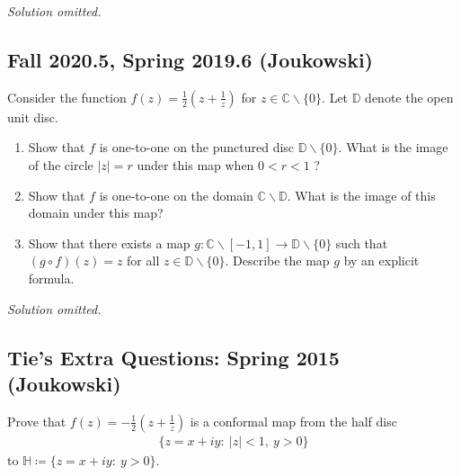 \emph{Solution omitted.}

\hypertarget{fall-2020.5-spring-2019.6-joukowski}{%
\subsection{Fall 2020.5, Spring 2019.6
(Joukowski)}\label{fall-2020.5-spring-2019.6-joukowski}}

\begin{problem}[?]

Consider the function \(f(z)=\frac{1}{2}\left(z+\frac{1}{z}\right)\) for
\(z \in \mathbb{C} \backslash\{0\}\). Let \(\mathbb{D}\) denote the open
unit disc.

\begin{enumerate}
\def\labelenumi{\alph{enumi}.}
\item
  Show that \(f\) is one-to-one on the punctured disc
  \(\mathbb{D} \backslash\{0\}\). What is the image of the circle
  \(|z|=r\) under this map when \(0<r<1\) ?
\item
  Show that \(f\) is one-to-one on the domain
  \(\mathbb{C} \backslash \mathbb{D}\). What is the image of this domain
  under this map?
\item
  Show that there exists a map
  \(g: \mathbb{C} \backslash[-1,1] \rightarrow \mathbb{D} \backslash\{0\}\)
  such that \((g \circ f)(z)=z\) for all
  \(z \in \mathbb{D} \backslash\{0\}\). Describe the map \(g\) by an
  explicit formula.
\end{enumerate}

\end{problem}

\emph{Solution omitted.}

\hypertarget{ties-extra-questions-spring-2015-joukowski}{%
\subsection{Tie's Extra Questions: Spring 2015
(Joukowski)}\label{ties-extra-questions-spring-2015-joukowski}}

\begin{problem}[?]

Prove that
\(\displaystyle{f(z)=-\frac{1}{2}\left(z+\frac{1}{z}\right)}\) is a
conformal map from the half disc
\begin{align*}
\{z=x+iy:\ |z|<1,\ y>0\}
\end{align*}
to \({\mathbb{H}}\coloneqq\{z=x+iy:\ y>0\}\).

\end{problem}

